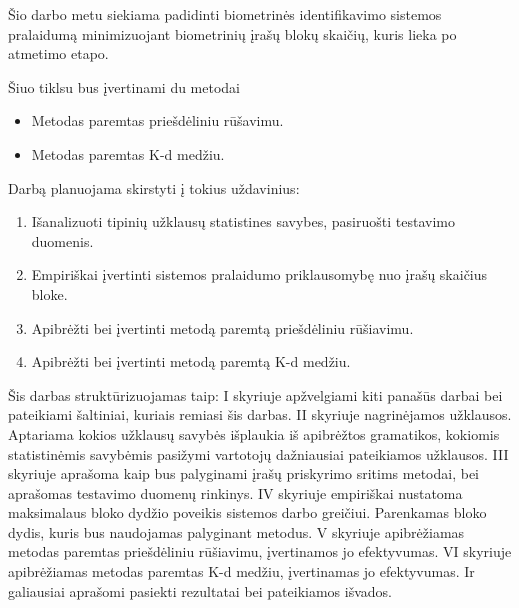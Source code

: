 Šio darbo metu siekiama padidinti biometrinės identifikavimo sistemos \cite{NeurotechnologyMegamatcherAccelerator} pralaidumą minimizuojant biometrinių įrašų blokų skaičių, kuris lieka po atmetimo etapo.

Šiuo tiklsu bus įvertinami du metodai
\begin{itemize}
		\item Metodas paremtas priešdėliniu rūšavimu.
		\item Metodas paremtas K-d medžiu.
\end{itemize}

Darbą planuojama skirstyti į tokius uždavinius:

\begin{enumerate}
	\item Išanalizuoti tipinių užklausų statistines savybes, pasiruošti testavimo duomenis.
	\item Empiriškai įvertinti sistemos pralaidumo priklausomybę nuo įrašų skaičius bloke.
	\item Apibrėžti bei įvertinti metodą paremtą priešdėliniu rūšiavimu.
	\item Apibrėžti bei įvertinti metodą paremtą K-d medžiu.
\end{enumerate}

Šis darbas struktūrizuojamas taip:
I skyriuje apžvelgiami kiti panašūs darbai bei pateikiami šaltiniai, kuriais remiasi šis darbas.
II skyriuje nagrinėjamos užklausos.
Aptariama kokios užklausų savybės išplaukia iš apibrėžtos gramatikos, kokiomis statistinėmis savybėmis pasižymi vartotojų dažniausiai pateikiamos užklausos.
III skyriuje aprašoma kaip bus palyginami įrašų priskyrimo sritims metodai, bei aprašomas testavimo duomenų rinkinys.
IV skyriuje empiriškai nustatoma maksimalaus bloko dydžio poveikis sistemos darbo greičiui.
Parenkamas bloko dydis, kuris bus naudojamas palyginant metodus.
V skyriuje apibrėžiamas metodas paremtas priešdėliniu rūšiavimu, įvertinamos jo efektyvumas.
VI skyriuje apibrėžiamas metodas paremtas K-d medžiu, įvertinamas jo efektyvumas.
Ir galiausiai aprašomi pasiekti rezultatai bei pateikiamos išvados.


